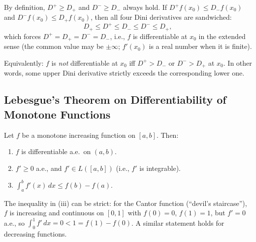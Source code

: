 \documentclass[11pt]{report}
\begin{document}
\begin{rembox}
By definition, $D^+ \geq D_+$ and $D^- \geq D_-$ always hold. If $D^+ f(x_0) \leq D_- f(x_0)$ and $D^- f(x_0) \leq D_+ f(x_0)$, then all four Dini derivatives are sandwiched:
\[
D_+ \leq D^+ \leq D_- \leq D^- \leq D_+,
\]
which forces $D^+ = D_+ = D^- = D_-$, i.e., $f$ is differentiable at $x_0$ in the extended sense (the common value may be $\pm\infty$; $f'(x_0)$ is a real number when it is finite).

Equivalently: $f$ is \textit{not} differentiable at $x_0$ iff $D^+ > D_-$ or $D^- > D_+$ at $x_0$. In other words, some upper Dini derivative strictly exceeds the corresponding lower one.
\end{rembox}

\subsection{Lebesgue's Theorem on Differentiability of Monotone Functions}

\begin{thmbox}
Let $f$ be a monotone increasing function on $[a, b]$. Then:
\begin{enumerate}[label=(\roman*)]
\item $f$ is differentiable a.e.\ on $(a, b)$.
\item $f' \geq 0$ a.e., and $f' \in L([a, b])$ (i.e., $f'$ is integrable).
\item $\displaystyle\int_a^b f'(x)\,dx \leq f(b) - f(a)$.
\end{enumerate}
\end{thmbox}

\begin{rembox}
The inequality in (iii) can be strict: for the Cantor function (``devil's staircase''), $f$ is increasing and continuous on $[0,1]$ with $f(0) = 0$, $f(1) = 1$, but $f' = 0$ a.e., so $\int_0^1 f'\,dx = 0 < 1 = f(1) - f(0)$. A similar statement holds for decreasing functions.
\end{rembox}
\end{document}

